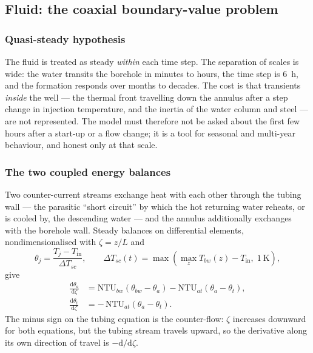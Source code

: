 \documentclass[11pt]{article}
\begin{document}
\subsection{Fluid: the coaxial boundary-value problem}
\label{sec:dbhe:fluid}

\subsubsection{Quasi-steady hypothesis}
The fluid is treated as steady \emph{within} each time step. The separation of
scales is wide: the water transits the borehole in minutes to hours, the time
step is \SI{6}{\hour}, and the formation responds over months to decades. The
cost is that transients \emph{inside} the well --- the thermal front travelling
down the annulus after a step change in injection temperature, and the inertia
of the water column and steel --- are not represented. The model must therefore
not be asked about the first few hours after a start-up or a flow change; it is
a tool for seasonal and multi-year behaviour, and honest only at that scale.

\subsubsection{The two coupled energy balances}
Two counter-current streams exchange heat with each other through the tubing
wall --- the parasitic ``short circuit'' by which the hot returning water reheats,
or is cooled by, the descending water --- and the annulus additionally exchanges
with the borehole wall. Steady balances on differential elements, nondimensionalised
with $\zeta=z/L$ and
\begin{equation}
\theta_j=\frac{T_j-T_{\mathrm{in}}}{\Delta T_{sc}}, \qquad \Delta
T_{sc}(t)=\max\!\left(\max_z T_{bw}(z)-T_{\mathrm{in}},\;\SI{1}{\kelvin}\right),
\label{eq:dbhe:scale}
\end{equation}
give
\begin{align}
\frac{\mathrm{d}\theta_a}{\mathrm{d}\zeta}
&=\mathrm{NTU}_{bw}\left(\theta_{bw}-\theta_a\right)
-\mathrm{NTU}_{at}\left(\theta_a-\theta_t\right),
\label{eq:dbhe:bvpa}\\[2pt]
\frac{\mathrm{d}\theta_t}{\mathrm{d}\zeta}
&=-\,\mathrm{NTU}_{at}\left(\theta_a-\theta_t\right).
\label{eq:dbhe:bvpt}
\end{align}
The minus sign on the tubing equation is the counter-flow: $\zeta$ increases
downward for both equations, but the tubing stream travels upward, so the
derivative along its own direction of travel is $-\mathrm{d}/\mathrm{d}\zeta$.
\end{document}
